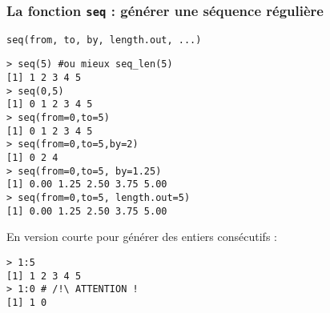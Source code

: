 \documentclass[10pt]{beamer}
\begin{document}
\begin{frame}[fragile]
  \frametitle{  La fonction \texttt{seq} : générer une séquence régulière}
  \begin{center}
    \alert{\texttt{seq(from, to, by, length.out, ...)}}
  \end{center}

\begin{lstlisting}
> seq(5) #ou mieux seq_len(5)
[1] 1 2 3 4 5
> seq(0,5)
[1] 0 1 2 3 4 5
> seq(from=0,to=5)
[1] 0 1 2 3 4 5
> seq(from=0,to=5,by=2)
[1] 0 2 4
> seq(from=0,to=5, by=1.25)
[1] 0.00 1.25 2.50 3.75 5.00
> seq(from=0,to=5, length.out=5)
[1] 0.00 1.25 2.50 3.75 5.00
\end{lstlisting}

En version courte pour générer des entiers consécutifs :
\begin{lstlisting}
> 1:5
[1] 1 2 3 4 5
> 1:0 # /!\ ATTENTION !
[1] 1 0
\end{lstlisting}
\end{frame}
\end{document}
